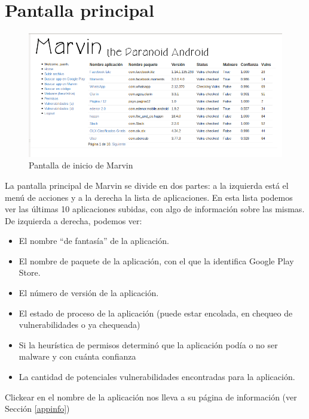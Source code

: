 \documentclass[11pt]{article}
\begin{document}
\section{Pantalla principal}
\begin{figure}[H]
\includegraphics[width=\textwidth]{graphics/marvin_main.png}
\caption{Pantalla de inicio de Marvin}
\end{figure}
La pantalla principal de Marvin se divide en dos partes: a la izquierda está el menú de acciones y a la derecha la lista de aplicaciones. En esta lista podemos ver las últimas 10 aplicaciones subidas, con algo de información sobre las mismas. De izquierda a derecha, podemos ver:
\begin{itemize}
\item El nombre ``de fantasía'' de la aplicación.
\item El nombre de paquete de la aplicación, con el que la identifica Google Play Store.
\item El número de versión de la aplicación.
\item El estado de proceso de la aplicación (puede estar encolada, en chequeo de vulnerabilidades o ya chequeada)
\item Si la heurística de permisos determinó que la aplicación podía o no ser malware y con cuánta confianza
\item La cantidad de potenciales vulnerabilidades encontradas para la aplicación.
\end{itemize}
Clickear en el nombre de la aplicación nos lleva a su página de información (ver Sección \ref{appinfo})
\end{document}
